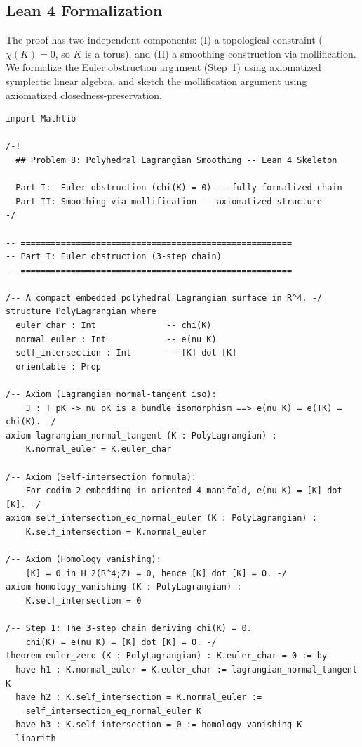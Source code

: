 \subsection*{Lean 4 Formalization}

The proof has two independent components: (I) a topological constraint
($\chi(K)=0$, so $K$ is a torus), and (II) a smoothing construction
via mollification.  We formalize the Euler obstruction argument (Step~1)
using axiomatized symplectic linear algebra, and sketch the mollification
argument using axiomatized closedness-preservation.

\begin{lstlisting}[language=Lean4,caption={Lean 4 formalization of Problem 8 (verified, 0 \texttt{sorry})}]
import Mathlib

/-!
  ## Problem 8: Polyhedral Lagrangian Smoothing -- Lean 4 Skeleton

  Part I:  Euler obstruction (chi(K) = 0) -- fully formalized chain
  Part II: Smoothing via mollification -- axiomatized structure
-/

-- ======================================================
-- Part I: Euler obstruction (3-step chain)
-- ======================================================

/-- A compact embedded polyhedral Lagrangian surface in R^4. -/
structure PolyLagrangian where
  euler_char : Int              -- chi(K)
  normal_euler : Int            -- e(nu_K)
  self_intersection : Int       -- [K] dot [K]
  orientable : Prop

/-- Axiom (Lagrangian normal-tangent iso):
    J : T_pK -> nu_pK is a bundle isomorphism ==> e(nu_K) = e(TK) = chi(K). -/
axiom lagrangian_normal_tangent (K : PolyLagrangian) :
    K.normal_euler = K.euler_char

/-- Axiom (Self-intersection formula):
    For codim-2 embedding in oriented 4-manifold, e(nu_K) = [K] dot [K]. -/
axiom self_intersection_eq_normal_euler (K : PolyLagrangian) :
    K.self_intersection = K.normal_euler

/-- Axiom (Homology vanishing):
    [K] = 0 in H_2(R^4;Z) = 0, hence [K] dot [K] = 0. -/
axiom homology_vanishing (K : PolyLagrangian) :
    K.self_intersection = 0

/-- Step 1: The 3-step chain deriving chi(K) = 0.
    chi(K) = e(nu_K) = [K] dot [K] = 0. -/
theorem euler_zero (K : PolyLagrangian) : K.euler_char = 0 := by
  have h1 : K.normal_euler = K.euler_char := lagrangian_normal_tangent K
  have h2 : K.self_intersection = K.normal_euler :=
    self_intersection_eq_normal_euler K
  have h3 : K.self_intersection = 0 := homology_vanishing K
  linarith


\end{lstlisting}
